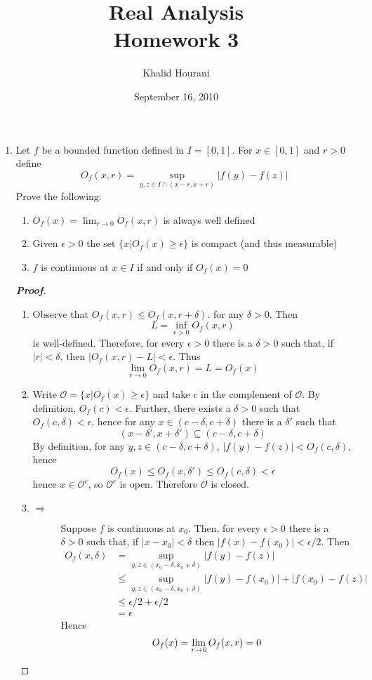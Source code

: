 \documentclass[12pt,leqno]{book}
\title{Real Analysis\\\large Homework 3}
\date{September 16, 2010}
\author{Khalid Hourani}
\theoremstyle{definition}
\newenvironment{Proof}{\begin{proof}[\textnormal{\textbf{Proof}}]}{\end{proof}}
\begin{document}
\begin{titlepage}
 \maketitle 
\end{titlepage}

\begin{enumerate}
  \item Let $f$ be a bounded function defined in $I=[0,1]$. For $x\in[0,1]$ and $r>0$ define \[O_f(x,r)=\sup_{y,z\in I\cap(x-r,x+r)}|f(y)-f(z)|\] Prove the following:
\begin{enumerate}
 \item $O_f(x)=\lim_{r\to0}O_f(x,r)$ is always well defined
 \item Given $\epsilon>0$ the set $\{x|O_f(x)\geq\epsilon\}$ is compact (and thus measurable)
 \item $f$ is continuous at $x\in I$ if and only if $O_f(x)=0$
\end{enumerate}
\begin{Proof}
 \begin{enumerate}
  \item Observe that $O_f(x,r)\leq O_f(x,r+\delta)$. for any $\delta>0$. Then \[L=\inf_{r>0}O_f(x,r)\] is well-defined. Therefore, for every $\epsilon>0$ there is a $\delta>0$ such that, if $|r|<\delta$, then $|O_f(x,r)-L|<\epsilon$. Thus \[\lim_{r\to0}O_f(x,r)=L=O_f(x)\]
  \item Write $\mathcal{O}=\{x|O_f(x)\geq\epsilon\}$ and take $c$ in the complement of $\mathcal{O}$. By definition, $O_f(c)<\epsilon$. Further, there exists a $\delta>0$ such that $O_f(c,\delta)<\epsilon$, hence for any $x\in(c-\delta,c+\delta)$ there is a $\delta'$ such that \[(x-\delta',x+\delta')\subseteq(c-\delta,c+\delta)\] By definition, for any $y,z\in(c-\delta,c+\delta)$, $|f(y)-f(z)|<O_f(c,\delta)$, hence \[O_f(x)\leq O_f(x,\delta')\leq O_f(c,\delta)<\epsilon\] hence $x\in\mathcal{O}^c$, so $\mathcal{O}^c$ is open. Therefore $\mathcal{O}$ is closed.
  \item \begin{description}
         \item [$\Rightarrow$]  Suppose $f$ is continuous at $x_0$. Then, for every $\epsilon>0$ there is a $\delta>0$ such that, if $|x-x_0|<\delta$ then $|f(x)-f(x_0)|<\epsilon/2$. Then \begin{align*}O_f(x,\delta)&=\sup_{y,z\in(x_0-\delta,x_0+\delta)}|f(y)-f(z)|\\&\leq\sup_{y,z\in(x_0-\delta,x_0+\delta)}|f(y)-f(x_0)|+|f(x_0)-f(z)|\\&\leq\epsilon/2+\epsilon/2\\&=\epsilon\end{align*} Hence \[O_f(x)=\lim_{r\to0}O_f(x,r)=0\qedhere\]

\end{description}
\end{enumerate}
\end{Proof}
\end{enumerate}
\end{document}
